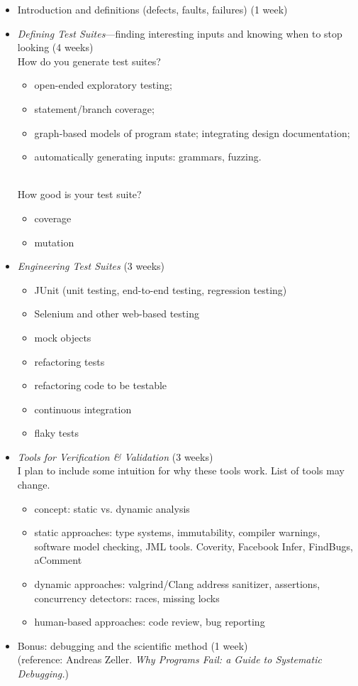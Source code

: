 \documentclass{article}
\begin{document}
\begin{itemize}
\item Introduction and definitions (defects, faults, failures) (1 week)
\item \emph{Defining Test Suites}---finding interesting inputs and knowing when to stop looking (4 weeks)\\
How do you generate test suites?
\begin{itemize}
\item open-ended exploratory testing;
\item statement/branch coverage;
\item graph-based models of program state; integrating design documentation;
\item automatically generating inputs: grammars, fuzzing.
\end{itemize}~\\[-1em]
How good is your test suite?
\begin{itemize}
\item coverage
\item mutation
\end{itemize}

\item \emph{Engineering Test Suites} (3 weeks)
\begin{itemize}
\item JUnit (unit testing, end-to-end testing, regression testing)
\item Selenium and other web-based testing
\item mock objects
\item refactoring tests
\item refactoring code to be testable
\item continuous integration
\item flaky tests
\end{itemize}

\item \emph{Tools for Verification \& Validation} (3 weeks)\\
I plan to include some intuition for why these tools work. List of tools may change.

\begin{itemize}
\item concept: static vs. dynamic analysis
\item static approaches: type systems, immutability, compiler warnings, software model checking, JML tools. Coverity, Facebook Infer, FindBugs, aComment
\item dynamic approaches: valgrind/Clang address sanitizer, assertions, concurrency detectors: races, missing locks
\item human-based approaches: code review, bug reporting
\end{itemize}

\item Bonus: debugging and the scientific method (1 week) \\
(reference: Andreas Zeller. \emph{Why Programs Fail: a Guide to Systematic Debugging.})
\end{itemize}
\end{document}
